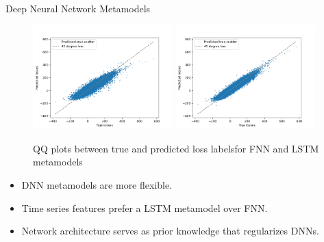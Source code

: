 \documentclass[9pt,handout]{beamer}
\begin{document}
\begin{frame}{Deep Neural Network Metamodels}

    \begin{figure}[H]
        \includegraphics[width=0.48\textwidth]{../project2/figures/qqPlots/fnnLN.png}
        \includegraphics[width=0.48\textwidth]{../project2/figures/qqPlots/lstmLoCapLN.png}
        \caption{QQ plots between true and predicted loss labelsfor FNN and LSTM metamodels}
    \end{figure}

    \begin{itemize}
        \item   DNN metamodels are more flexible.
        \item   Time series features prefer a LSTM metamodel over FNN.
        \item   Network architecture serves as prior knowledge that regularizes DNNs.
    \end{itemize}

\end{frame}
\end{document}
